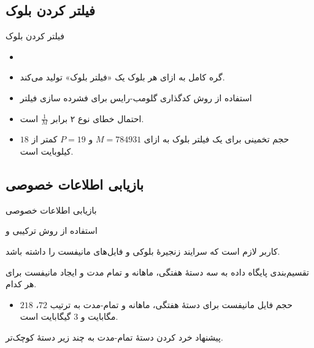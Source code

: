 \documentclass{beamer}
\begin{document}
\subsection{فیلتر کردن بلوک}

\begin{frame}{فیلتر کردن بلوک}
	\begin{itemize}
		\item{}
		\item {%
		گره کامل به ازای هر بلوک یک «فیلتر بلوک» تولید می‌کند.}
		\item{%
		استفاده از روش کدگذاری گلومب-رایس برای فشرده سازی فیلتر}
		\item{%
		احتمال خطای نوع ۲ برابر $\frac{1}{M}$} است.
		\item{%
		حجم تخمینی برای یک فیلتر بلوک به ازای 
	$M = 784931$
و
	$P = 19$
کمتر از 
	$18$
کیلوبایت است.}
	\end{itemize}

	\begin{center}
	{\small {}}
	\end{center}

\end{frame}

\subsection{بازیابی اطلاعات خصوصی}
\begin{frame}{بازیابی اطلاعات خصوصی}
\begin{itemize}
	\item {%
	استفاده از روش ترکیبی  و }
	\item {%
	کاربر لازم است که سرایند زنجیرهٔ بلوکی و فایل‌های مانیفست را داشته باشد.}
	\item {%
	تقسیم‌بندی پایگاه داده به سه دستهٔ هفتگی، ماهانه و تمام مدت و ایجاد مانیفست برای هر کدام.
	\begin{itemize}
		\item {%
		حجم فایل مانیفست برای دستهٔ هفتگی، ماهانه و تمام-مدت به ترتیب $72$، ‌$218$ مگابایت و $3$ گیگابایت است.}
	\end{itemize}
	\item{%
	پیشنهاد خرد کردن دستهٔ تمام-مدت به چند زیر دستهٔ کوچک‌تر.}
}
\end{itemize}

\begin{center}
	{\small {}}
\end{center}
\end{frame}
\end{document}
